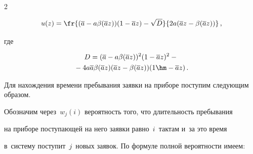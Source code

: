 \begin{multicols}{2}
\noindent

\begin{equation}

\label{us}

u(z) = \fr{(\overline{a}-a\beta(\overline{a} z))(1-\overline{a} z) - \sqrt{D}

}{2 a (\overline{a} z - \beta(\overline{a} z))}\,,

\end{equation}



\vspace*{-3pt}



\noindent

где 



\vspace*{-3pt}



\noindent

\begin{multline*}

D = (\overline{a}-a\beta(\overline{a} z))^2(1-\overline{a} z)^2 

-{}\\

{}- 4a \overline{a}\beta(\overline{a} z)(\overline{a} z - 

\beta(\overline{a} z))(1\hm-\overline{a} z)\,.

\end{multline*}



\vspace*{-2pt}



Для нахождения времени пребывания заявки на приборе поступим следующим образом.

Обозначим через~$w_j(i)$ вероятность того, что длительность пребывания

на приборе поступающей на него заявки равно~$i$~тактам и~за это время

в~систему поступит~$j$~новых заявок. По формуле полной ве\-ро\-ят\-ности имеем:



\vspace*{-3pt}



\noindent

\begin{align}

\label{gix1}


\end{align}
\end{multicols}
